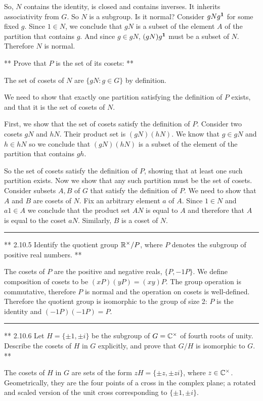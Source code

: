 So, $N$ contains the identity, is closed and contains inverses. It inherits
associativity from $G$. So $N$ is a subgroup. Is it normal? Consider $gNg^{\mathbf 1}$
for some fixed $g$. Since $1 \in N$, we conclude that $gN$ is a subset of the
element $A$ of the partition that contains $g$. And since $g \in gN$,
$(gN)g^{\mathbf 1}$ must be a subset of $N$. Therefore $N$ is normal.

** Prove that $P$ is the set of its cosets: **

The set of cosets of $N$ are $\{gN: g \in G\}$ by definition.

We need to show that exactly one partition satisfying the definition of $P$
exists, and that it is the set of cosets of $N$.

First, we show that the set of cosets satisfy the definition of $P$. Consider
two cosets $gN$ and $hN$. Their product set is $(gN)(hN)$. We know that $g \in
gN$ and $h \in hN$ so we conclude that $(gN)(hN)$ is a subset of the element of
the partition that contains $gh$.

So the set of cosets satisfy the definition of $P$, showing that at least one
such partition exists. Now we show that any such partition must be the set of
cosets. Consider subsets $A, B$ of $G$ that satisfy the definition of $P$. We
need to show that $A$ and $B$ are cosets of $N$. Fix an arbitrary element $a$
of $A$. Since $1 \in N$ and $a1 \in A$ we conclude that the product set $AN$ is
equal to $A$ and therefore that $A$ is equal to the coset $aN$. Similarly, $B$
is a coset of $N$.

\hrule

** 2.10.5 Identify the quotient group $\mathbb{R}^\times/P$, where $P$ denotes the subgroup of
positive real numbers. **

The cosets of $P$ are the positive and negative reals, $\{P, -1P\}$. We define
composition of cosets to be $(xP)(yP) = (xy)P$. The group operation is
commutative, therefore $P$ is normal and the operation on cosets is
well-defined. Therefore the quotient group is isomorphic to the group of size
2: $P$ is the identity and $(-1P)(-1P) = P$.

\hrule

** 2.10.6 Let $H = \{±1, ±i\}$ be the subgroup of $G = \mathbb{C}^\times$ of fourth roots
of unity. Describe the cosets of $H$ in $G$ explicitly, and prove that $G/H$ is
isomorphic to $G$. **

The cosets of $H$ in $G$ are sets of the form $zH = \{±z, ±zi\}$, where $z \in
\mathbb{C}^\times$. Geometrically, they are the four points of a cross in the complex
plane; a rotated and scaled version of the unit cross corresponding to $\{±1,
±i\}$.

